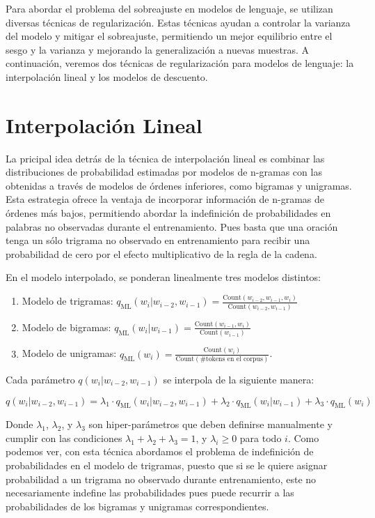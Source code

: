 Para abordar el problema del sobreajuste en modelos de lenguaje, se utilizan diversas técnicas de regularización. Estas técnicas ayudan a controlar la varianza del modelo y mitigar el sobreajuste, permitiendo un mejor equilibrio entre el sesgo y la varianza y mejorando la generalización a nuevas muestras. A continuación, veremos dos técnicas de regularización para modelos de lenguaje: la interpolación lineal y los modelos de descuento.




\section{Interpolación Lineal}

La pricipal idea detrás de la técnica de interpolación lineal es combinar las distribuciones de probabilidad estimadas por modelos de n-gramas con las obtenidas a través de modelos de órdenes inferiores, como bigramas y unigramas. Esta estrategia ofrece la ventaja de incorporar información de n-gramas de órdenes más bajos, permitiendo abordar la indefinición de probabilidades en palabras no observadas durante el entrenamiento. Pues basta que una oración tenga un sólo trigrama no observado en entrenamiento para recibir una probabilidad de cero por el efecto multiplicativo de la regla de la cadena.

En el modelo interpolado, se ponderan linealmente tres modelos distintos:

\begin{enumerate}
    \item Modelo de trigramas: $q_{\text{ML}}(w_i | w_{i-2}, w_{i-1}) = \frac{{\text{Count}(w_{i-2}, w_{i-1}, w_i)}}{{\text{Count}(w_{i-2}, w_{i-1})}}$
    \item Modelo de bigramas: $q_{\text{ML}}(w_i | w_{i-1}) = \frac{{\text{Count}(w_{i-1}, w_i)}}{{\text{Count}(w_{i-1})}}$
    \item Modelo de unigramas: $q_{\text{ML}}(w_i) = \frac{{\text{Count}(w_i)}}{{\text{Count}(\# \text{tokens en el corpus})}}$.
\end{enumerate}

Cada parámetro $q(w_i | w_{i-2}, w_{i-1})$ se interpola de la siguiente manera:

\[
q(w_i | w_{i-2}, w_{i-1}) = \lambda_1 \cdot q_{\text{ML}}(w_i | w_{i-2}, w_{i-1}) + \lambda_2 \cdot q_{\text{ML}}(w_i | w_{i-1}) + \lambda_3 \cdot q_{\text{ML}}(w_i)
\]

Donde $\lambda_1$, $\lambda_2$, y $\lambda_3$ son hiper-parámetros que deben definirse manualmente y cumplir con las condiciones $\lambda_1 + \lambda_2 + \lambda_3 = 1$, y $\lambda_i \geq 0$ para todo $i$. Como podemos ver, con esta técnica abordamos el problema de indefinición de probabilidades en el modelo de trigramas, puesto que si se le quiere asignar probabilidad a un trigrama no observado durante entrenamiento, este no necesariamente indefine las probabilidades pues puede recurrir a las probabilidades de los bigramas y unigramas correspondientes.


